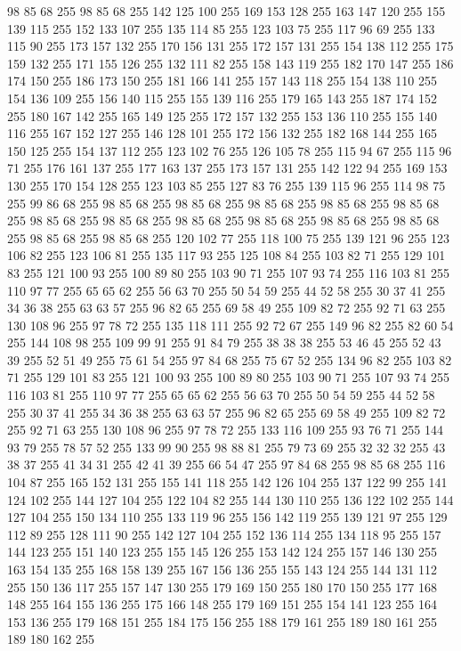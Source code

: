 98 85 68 255 98 85 68 255 142 125 100 255 169 153 128 255 163 147 120 255 155 139 115 255 152 133 107 255 135 114 85 255 123 103 75 255 117 96 69 255 133 115 90 255 173 157 132 255 170 156 131 255 172 157 131 255 154 138 112 255 175 159 132 255 171 155 126 255 132 111 82 255 158 143 119 255 182 170 147 255 186 174 150 255 186 173 150 255 181 166 141 255 157 143 118 255 154 138 110 255 154 136 109 255 156 140 115 255 155 139 116 255 179 165 143 255 187 174 152 255 180 167 142 255 165 149 125 255 172 157 132 255 153 136 110 255 155 140 116 255 167 152 127 255 146 128 101 255 172 156 132 255 182 168 144 255 165 150 125 255 154 137 112 255 123 102 76 255 126 105 78 255 115 94 67 255 115 96 71 255 176 161 137 255 177 163 137 255 173 157 131 255 142 122 94 255 169 153 130 255 170 154 128 255 123 103 85 255 127 83 76 255 139 115 96 255 114 98 75 255 99 86 68 255 98 85 68 255 98 85 68 255 98 85 68 255 98 85 68 255 98 85 68 255 98 85 68 255 98 85 68 255 98 85 68 255
98 85 68 255 98 85 68 255 98 85 68 255 98 85 68 255 98 85 68 255 120 102 77 255 118 100 75 255 139 121 96 255 123 106 82 255 123 106 81 255 135 117 93 255 125 108 84 255 103 82 71 255 129 101 83 255 121 100 93 255 100 89 80 255 103 90 71 255 107 93 74 255 116 103 81 255 110 97 77 255 65 65 62 255 56 63 70 255 50 54 59 255 44 52 58 255 30 37 41 255 34 36 38 255 63 63 57 255 96 82 65 255 69 58 49 255 109 82 72 255 92 71 63 255 130 108 96 255 97 78 72 255 135 118 111 255 92 72 67 255 149 96 82 255 82 60 54 255 144 108 98 255 109 99 91 255 91 84 79 255 38 38 38 255 53 46 45 255 52 43 39 255 52 51 49 255 75 61 54 255 97 84 68 255 75 67 52 255 134 96 82 255 103 82 71 255 129 101 83 255 121 100 93 255 100 89 80 255 103 90 71 255 107 93 74 255 116 103 81 255 110 97 77 255 65 65 62 255 56 63 70 255 50 54 59 255 44 52 58 255 30 37 41 255 34 36 38 255 63 63 57 255 96 82 65 255
69 58 49 255 109 82 72 255 92 71 63 255 130 108 96 255 97 78 72 255 133 116 109 255 93 76 71 255 144 93 79 255 78 57 52 255 133 99 90 255 98 88 81 255 79 73 69 255 32 32 32 255 43 38 37 255 41 34 31 255 42 41 39 255 66 54 47 255 97 84 68 255 98 85 68 255 116 104 87 255 165 152 131 255 155 141 118 255 142 126 104 255 137 122 99 255 141 124 102 255 144 127 104 255 122 104 82 255 144 130 110 255 136 122 102 255 144 127 104 255 150 134 110 255 133 119 96 255 156 142 119 255 139 121 97 255 129 112 89 255 128 111 90 255 142 127 104 255 152 136 114 255 134 118 95 255 157 144 123 255 151 140 123 255 155 145 126 255 153 142 124 255 157 146 130 255 163 154 135 255 168 158 139 255 167 156 136 255 155 143 124 255 144 131 112 255 150 136 117 255 157 147 130 255 179 169 150 255 180 170 150 255 177 168 148 255 164 155 136 255 175 166 148 255 179 169 151 255 154 141 123 255 164 153 136 255 179 168 151 255 184 175 156 255 188 179 161 255 189 180 161 255 189 180 162 255

